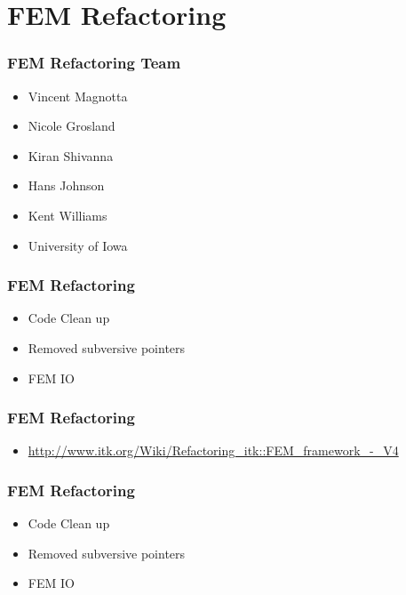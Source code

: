 \section{FEM Refactoring}




\begin{frame}
\frametitle{FEM Refactoring Team}
\large
\begin{itemize}
\item Vincent Magnotta
\pause
\item Nicole Grosland
\pause
\item Kiran Shivanna
\pause
\item Hans Johnson
\pause
\item Kent Williams
\pause
\item University of Iowa
\end{itemize}
\end{frame}


\begin{frame}
\frametitle{FEM Refactoring}
\Huge
\begin{itemize}
\item Code Clean up
\pause
\item Removed subversive pointers
\pause
\item FEM IO
\end{itemize}
\end{frame}


\begin{frame}
\frametitle{FEM Refactoring}
\begin{itemize}
\item \url{http://www.itk.org/Wiki/Refactoring_itk::FEM_framework_-_V4}
\end{itemize}
\end{frame}

\begin{frame}
\frametitle{FEM Refactoring}
\Huge
\begin{itemize}
\item Code Clean up
\pause
\item Removed subversive pointers
\pause
\item FEM IO
\end{itemize}
\end{frame}

